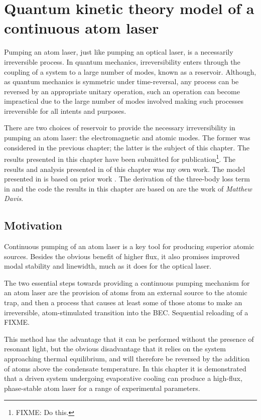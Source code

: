 \chapter{Quantum kinetic theory model of a continuous atom laser}
\label{KineticTheory}
\graphicspath{{Figures/KineticTheory/}{Figures/Common/}}

Pumping an atom laser, just like pumping an optical laser, is a necessarily irreversible process. In quantum mechanics, irreversibility enters through the coupling of a system to a large number of modes, known as a reservoir. Although, as quantum mechanics is symmetric under time-reversal, any process can be reversed by an appropriate unitary operation, such an operation can become impractical due to the large number of modes involved making such processes irreversible for all intents and purposes.

There are two choices of reservoir to provide the necessary irreversibility in pumping an atom laser: the electromagnetic and atomic modes. The former was considered in the previous chapter; the latter is the subject of this chapter. The results presented in this chapter have been submitted for publication\footnote{FIXME: Do this.}. The results and analysis presented in  of this chapter was my own work. The model presented in  is based on prior work \citep{Davis:2000vn,Bijlsma:2000}. The derivation of the three-body loss term in  and the code the results in this chapter are based on are the work of \emph{Matthew Davis}.

\section{Motivation}

Continuous pumping of an atom laser is a key tool for producing superior atomic sources. Besides the obvious benefit of higher flux, it also promises improved modal stability and linewidth, much as it does for the optical laser.

The two essential steps towards providing a continuous pumping mechanism for an atom laser are the provision of atoms from an external source to the atomic trap, and then a process that causes at least some of those atoms to make an irreversible, atom-stimulated transition into the BEC. Sequential reloading of a FIXME.

This method has the advantage that it can be performed without the presence of resonant light, but the obvious disadvantage that it relies on the system approaching thermal equilibrium, and will therefore be reversed by the addition of atoms above the condensate temperature. In this chapter it is demonstrated that a driven system undergoing evaporative cooling can produce a high-flux, phase-stable atom laser for a range of experimental parameters.

